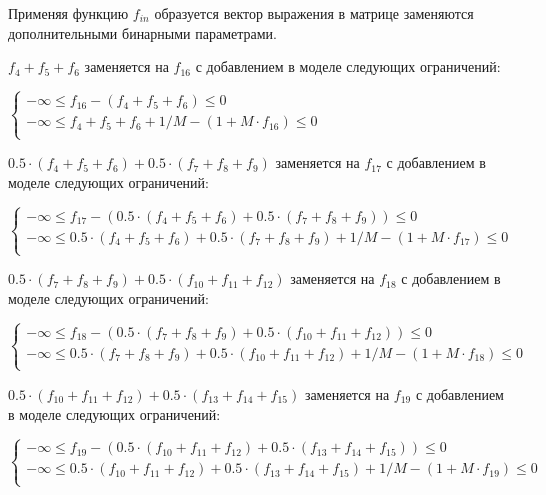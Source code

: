 \begin{enumerate}
  Применяя функцию $f_{in}$ образуется вектор выражения в матрице заменяются дополнительными бинарными параметрами.

  $f_{4} + f_{5} + f_{6}$ заменяется на $f_{16}$ с добавлением в моделе следующих ограничений:
  \begin{center}
    $
      \begin{cases}
        -\infty \le f_{16} - (f_{4} + f_{5} + f_{6}) \le 0 \\ %
        -\infty \le f_{4} + f_{5} + f_{6} + 1 / M - (1 + M \cdot f_{16}) \le 0 \\ %
      \end{cases}
    $
  \end{center}

  $0.5 \cdot (f_{4} + f_{5} + f_{6}) + 0.5 \cdot (f_{7} + f_{8} + f_{9})$ заменяется на $f_{17}$ с добавлением в моделе следующих ограничений:
  \begin{center}
    $
      \begin{cases}
        -\infty \le f_{17} - (0.5 \cdot (f_{4} + f_{5} + f_{6}) + 0.5 \cdot (f_{7} + f_{8} + f_{9})) \le 0 \\ %
        -\infty \le 0.5 \cdot (f_{4} + f_{5} + f_{6}) + 0.5 \cdot (f_{7} + f_{8} + f_{9}) + 1 / M - (1 + M \cdot f_{17}) \le 0 \\ %
      \end{cases}
    $
  \end{center}

  $0.5 \cdot (f_{7} + f_{8} + f_{9}) + 0.5 \cdot (f_{10} + f_{11} + f_{12})$ заменяется на $f_{18}$ с добавлением в моделе следующих ограничений:
  \begin{center}
    $
      \begin{cases}
        -\infty \le f_{18} - (0.5 \cdot (f_{7} + f_{8} + f_{9}) + 0.5 \cdot (f_{10} + f_{11} + f_{12})) \le 0 \\ %
        -\infty \le 0.5 \cdot (f_{7} + f_{8} + f_{9}) + 0.5 \cdot (f_{10} + f_{11} + f_{12}) + 1 / M - (1 + M \cdot f_{18}) \le 0 \\ %
      \end{cases}
    $
  \end{center}

  $0.5 \cdot (f_{10} + f_{11} + f_{12}) + 0.5 \cdot (f_{13} + f_{14} + f_{15})$ заменяется на $f_{19}$ с добавлением в моделе следующих ограничений:
  \begin{center}
    $
      \begin{cases}
        -\infty \le f_{19} - (0.5 \cdot (f_{10} + f_{11} + f_{12}) + 0.5 \cdot (f_{13} + f_{14} + f_{15})) \le 0 \\ %
        -\infty \le 0.5 \cdot (f_{10} + f_{11} + f_{12}) + 0.5 \cdot (f_{13} + f_{14} + f_{15}) + 1 / M - (1 + M \cdot f_{19}) \le 0 \\ %
      \end{cases}
    $
  \end{center}


\end{enumerate}
